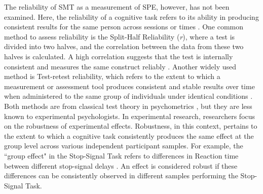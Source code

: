 \documentclass[sn-apa]{sn-jnl}%
\theoremstyle{thmstyleone}%
\theoremstyle{thmstyletwo}%
\theoremstyle{thmstylethree}%
\begin{document}
The reliability of SMT as a measurement of SPE, however, has not been examined. Here, the reliability of a cognitive task refers to its ability in producing consistent results for the same person across sessions or times \parencite{parsons2019psychological,zorowitz2023}. One common method to assess reliability is the Split-Half Reliability (\textit{r}), where a test is divided into two halves, and the correlation between the data from these two halves is calculated. A high correlation suggests that the test is internally consistent and measures the same construct reliably \parencite{pronk2022methods}. Another widely used method is Test-retest reliability, which refers to the extent to which a measurement or assessment tool produces consistent and stable results over time when administered to the same group of individuals under identical conditions \parencite{kline2015handbook}. Both methods are from classical test theory in psychometrics \parencite{borsboom2005measuring}, but they are less known to experimental psychologists. In experimental research, researchers focus on the robustness of experimental effects. Robustness, in this context, pertains to the extent to which a cognitive task consistently produces the same effect at the group level across various independent participant samples. For example, the ``group effect" in the Stop-Signal Task refers to differences in Reaction time between different stop-signal delays \parencite{hedge2018reliability}. An effect is considered robust if these differences can be consistently observed in different samples performing the Stop-Signal Task.
\end{document}
